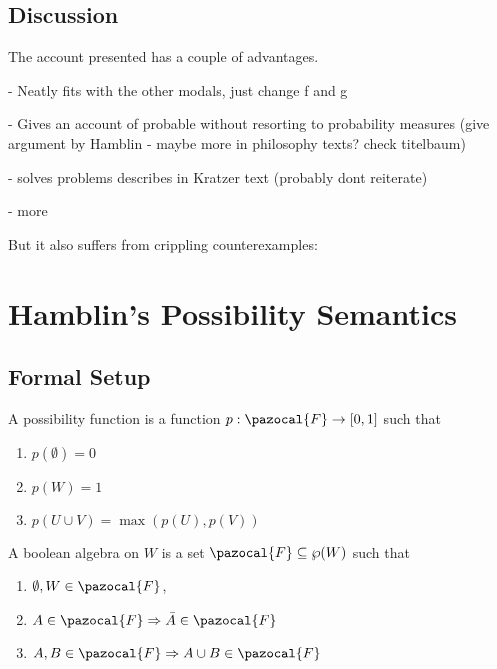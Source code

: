 \documentclass{article}
\theoremstyle{definition}
\renewcommand{\F}{\pazocal{F}}
\begin{document}
\subsection{Discussion}

The account presented has a couple of advantages.

- Neatly fits with the other modals, just change f and g

- Gives an account of probable without resorting to probability measures (give argument by Hamblin - maybe more in philosophy texts? check titelbaum)

- solves problems describes in Kratzer text (probably dont reiterate)  

- more

But it also suffers from crippling counterexamples: 

\section{Hamblin's Possibility Semantics}
\subsection{Formal Setup}
\noindent A possibility function is a function $p: \F \rightarrow [0,1]$ such that
\begin{enumerate}[nosep]
  \item $p(\emptyset) = 0$ 
  \item $p(W) = 1$
  \item $p(U \cup V) = \max(p(U),p(V))$
\end{enumerate}
\noindent A boolean algebra on $W$ is a set $\F \subseteq \wp(W)$ such that
\begin{enumerate}[nosep]
  \item $\emptyset, W \in \F$,
  \item $A \in \F \Rightarrow \bar{A} \in \F$
  \item $A,B \in \F \Rightarrow A \cup B \in \F$
\end{enumerate}
\end{document}

